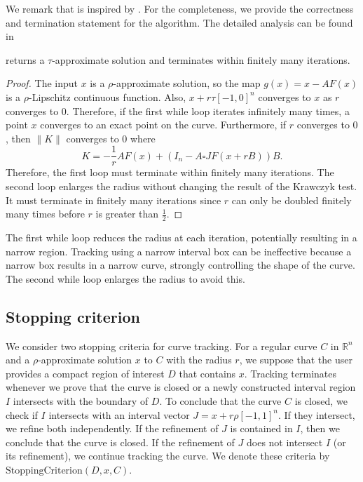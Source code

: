 We remark that  is inspired by \cite[Algorithm 2]{guillemot2024validated}. For the completeness, we provide the correctness and termination statement for the algorithm. The detailed analysis can be found in \cite[Section 4.2]{guillemot2024validated} 
\begin{lemma}
 returns a $\tau$-approximate solution and terminates within finitely many iterations.
\end{lemma}
\begin{proof}
    The input $x$ is a $\rho$-approximate solution, so the map $g(x)=x-AF(x)$ is a $\rho$-Lipschitz continuous function. Also, $x+r\tau[-1,0]^n$ converges to $x$ as $r$ converges to $0$. Therefore, if the first while loop iterates infinitely many times, a point $x$ converges to an exact point on the curve. Furthermore, if $r$ converges to $0$, then $\|K\|$ converges to $0$ where 
    $$K=-\frac{1}{r}A F(x)+\left(I_n-A\square JF(x+rB)\right)B.$$
    Therefore, the first loop must terminate within finitely many iterations.  The second loop enlarges the radius without changing the result of the Krawczyk test. It must terminate in finitely many iterations since $r$ can only be doubled finitely many times before $r$ is greater than $\frac{1}{2}$.
\end{proof}

The first while loop reduces the radius at each iteration, potentially resulting in a narrow region. Tracking using a narrow interval box can be ineffective because a narrow box results in a narrow curve, strongly controlling the shape of the curve.  The second while loop enlarges the radius to avoid this.

\subsection{Stopping criterion}

We consider two stopping criteria for curve tracking. For a regular curve $C$ in $\mathbb{R}^n$ and a $\rho$-approximate solution $x$ to $C$ with the radius $r$, we suppose that the user provides a compact region of interest $D$ that contains $x$. Tracking terminates whenever we prove that the curve is closed or a newly constructed interval region $I$ intersects with the boundary of $D$. To conclude that the curve $C$ is closed, we check if $I$ intersects with an interval vector $J = x+r\rho[-1,1]^n$. If they intersect, we refine both independently. If the refinement of $J$ is contained in $I$, then we conclude that the curve is closed. If the refinement of $J$ does not intersect $I$ (or its refinement), we continue tracking the curve. We denote these criteria by $\text{StoppingCriterion}(D,x,C)$.

